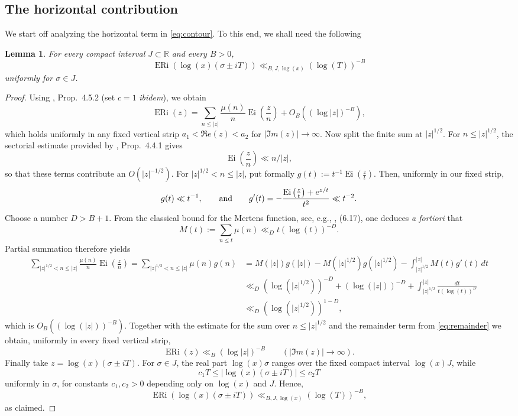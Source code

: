 \documentclass[a4paper,10pt]{amsart}
\DeclareMathOperator{\Ei}{Ei}
\DeclareMathOperator{\ERi}{ERi}
\newtheorem{lemma}[equation]{Lemma}
\theoremstyle{definition}
\numberwithin{equation}{section}
\begin{document}
\subsection{The horizontal contribution}
We start off analyzing the horizontal term in \eqref{eq:contour}. To this end, we shall need the following


\begin{lemma}\label{lem:decay}
For every compact interval $J\subset\mathbb R$ and every $B>0$,
$$
\ERi(\log(x)(\sigma\pm iT))
\ll_{B,J,\log(x)}(\log(T))^{-B}
$$
uniformly for $\sigma\in J$.
\end{lemma}

\begin{proof}
Using \cite{Elliott2025}, Prop.\ 4.5.2 (set $c=1$ {\it ibidem}), we obtain 
\begin{equation}\label{eq:remainder}
\ERi(z)=\sum_{n\le |z|}\frac{\mu(n)}n\Ei\left(\frac{z}{n}\right)
+O_B((\log|z|)^{-B}),
\end{equation}
which holds uniformly in any fixed vertical strip $a_1<\Re e(z)<a_2$ for $|\Im m(z)|\to\infty$. Now split the finite sum at $|z|^{1/2}$. For $n\le |z|^{1/2}$, the sectorial estimate provided by \cite{Elliott2025}, Prop.\ 4.4.1 gives
$$
\Ei\left(\frac{z}{n}\right)\ll n/|z|,
$$
so that these terms contribute an $O(|z|^{-1/2})$. For $|z|^{1/2}<n\le|z|$, put formally $g(t):=t^{-1}\Ei\left(\frac{z}{t}\right)$. Then, uniformly in our fixed
strip,
$$
g(t)\ll t^{-1},\qquad {\rm and}\qquad g'(t)= -\frac{\Ei\left(\frac{z}{t}\right)+e^{z/t}}{t^2} \ll t^{-2}.
$$
Choose a number $D>B+1$. From the classical bound for the Mertens function, see, e.g., \cite{MontgomeryVaughan}, (6.17), one deduces {\it a fortiori} that
$$
M(t):=\sum_{n\le t}\mu(n)
\ll_D t(\log(t))^{-D}.
$$
Partial summation therefore yields
$$
\begin{aligned}
\sum_{|z|^{1/2}<n\le |z|} \frac{\mu(n)}n\Ei\left(\frac{z}{n}\right) = \sum_{|z|^{1/2}<n\le |z|}\mu(n)g(n)
&=M(|z|)g(|z|) -M(|z|^{1/2})g(|z|^{1/2}) -\int_{|z|^{1/2}}^{|z|}M(t)g'(t)\,dt\\
&\ll_D (\log(|z|^{1/2}))^{-D} +(\log(|z|))^{-D} +\int_{|z|^{1/2}}^{|z|} \frac{dt}{t(\log(t))^D}\\
&\ll_D (\log(|z|^{1/2}))^{1-D},
\end{aligned}
$$
which is $O_B((\log(|z|))^{-B})$. Together with the estimate for the sum over $n\le |z|^{1/2}$ and the remainder term from \eqref{eq:remainder} we obtain, uniformly in every fixed vertical strip,
$$
\ERi(z)\ll_B(\log|z|)^{-B}
\qquad (|\Im m(z)|\to\infty).
$$
Finally take $z=\log(x)(\sigma\pm iT)$. For $\sigma\in J$, the real part $\log(x)\sigma$ ranges over the fixed compact interval $\log(x)J$, while
$$
c_1T\leq |\log(x)(\sigma\pm iT)| \leq c_2T
$$
uniformly in $\sigma$, for constants $c_1,c_2>0$ depending only on $\log(x)$ and $J$. Hence,
$$\ERi(\log(x)(\sigma\pm iT)) \ll_{B,J,\log(x)}(\log(T))^{-B},$$
as claimed.
\end{proof}
\end{document}
